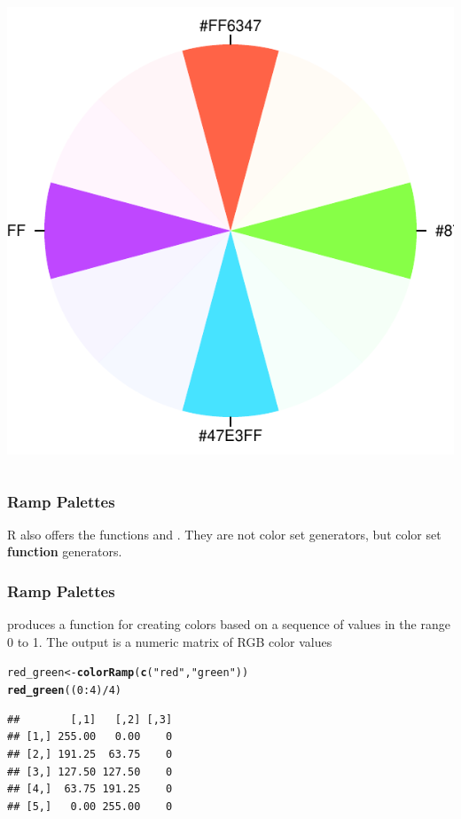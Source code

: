 \documentclass[12pt]{beamer}\usepackage[]{graphicx}\usepackage[]{color}
\makeatletter
\newcommand{\hlnum}[1]{\textcolor[rgb]{0.686,0.059,0.569}{#1}}%
\newcommand{\hlstr}[1]{\textcolor[rgb]{0.192,0.494,0.8}{#1}}%
\newcommand{\hlopt}[1]{\textcolor[rgb]{0,0,0}{#1}}%
\newcommand{\hlstd}[1]{\textcolor[rgb]{0.345,0.345,0.345}{#1}}%
\newcommand{\hlkwb}[1]{\textcolor[rgb]{0.69,0.353,0.396}{#1}}%
\newcommand{\hlkwd}[1]{\textcolor[rgb]{0.737,0.353,0.396}{\textbf{#1}}}%
\newenvironment{kframe}{%
 \def\at@end@of@kframe{}%
 \ifinner\ifhmode%
  \def\at@end@of@kframe{\end{minipage}}%
  \begin{minipage}{\columnwidth}%
 \fi\fi%
 \def\FrameCommand##1{\hskip\@totalleftmargin \hskip-\fboxsep
 \colorbox{shadecolor}{##1}\hskip-\fboxsep
     \hskip-\linewidth \hskip-\@totalleftmargin \hskip\columnwidth}%
 \MakeFramed {\advance\hsize-\width
   \@totalleftmargin\z@ \linewidth\hsize
   \@setminipage}}%
 {\par\unskip\endMakeFramed%
 \at@end@of@kframe}
\newenvironment{knitrout}{}{} %
\makeatother
\begin{document}
\begin{frame}[fragile]
\begin{columns}[t]
\begin{column}{0.5\textwidth}
\begin{knitrout}
{\centering \includegraphics[width=.6\linewidth,height=.6\linewidth]{figure/tomato_square-1} 

}



\end{knitrout}
\end{column}
\end{columns}

\end{frame}


\begin{frame}
\frametitle{Ramp Palettes}

R also offers the functions  and . They are not color set generators, but color set \textbf{function} generators.
\eb

\end{frame}


\begin{frame}[fragile]
\frametitle{Ramp Palettes}

 produces a function for creating colors based on a sequence of values in the range 0 to 1. The output is a numeric matrix of RGB color values
\begin{knitrout}\footnotesize
{}\color{fgcolor}\begin{kframe}
\begin{alltt}
\hlstd{red_green} \hlkwb{<-} \hlkwd{colorRamp}\hlstd{(}\hlkwd{c}\hlstd{(}\hlstr{"red"}\hlstd{,} \hlstr{"green"}\hlstd{))}
\hlkwd{red_green}\hlstd{( (}\hlnum{0}\hlopt{:}\hlnum{4}\hlstd{)}\hlopt{/}\hlnum{4} \hlstd{)}
\end{alltt}
\begin{verbatim}
##        [,1]   [,2] [,3]
## [1,] 255.00   0.00    0
## [2,] 191.25  63.75    0
## [3,] 127.50 127.50    0
## [4,]  63.75 191.25    0
## [5,]   0.00 255.00    0
\end{verbatim}
\end{kframe}
\end{knitrout}
\eb

\end{frame}
\end{document}
